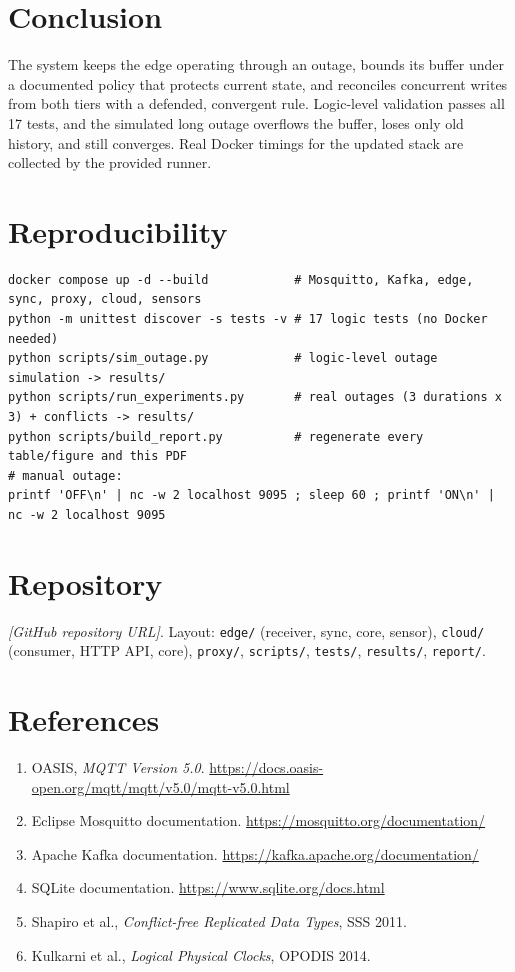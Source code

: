 \documentclass[11pt,a4paper]{article}
\newcommand{\repourl}{\textit{[GitHub repository URL]}}
\begin{document}
\section{Conclusion}
The system keeps the edge operating through an outage, bounds its buffer under a documented policy that protects
current state, and reconciles concurrent writes from both tiers with a defended, convergent rule. Logic-level
validation passes all 17 tests, and the simulated long outage overflows the buffer, loses only old history, and still
converges. Real Docker timings for the updated stack are collected by the provided runner.

\appendix
\section{Reproducibility}
\begin{lstlisting}
docker compose up -d --build            # Mosquitto, Kafka, edge, sync, proxy, cloud, sensors
python -m unittest discover -s tests -v # 17 logic tests (no Docker needed)
python scripts/sim_outage.py            # logic-level outage simulation -> results/
python scripts/run_experiments.py       # real outages (3 durations x 3) + conflicts -> results/
python scripts/build_report.py          # regenerate every table/figure and this PDF
# manual outage:
printf 'OFF\n' | nc -w 2 localhost 9095 ; sleep 60 ; printf 'ON\n' | nc -w 2 localhost 9095
\end{lstlisting}

\section{Repository}
\repourl. Layout: \texttt{edge/} (receiver, sync, core, sensor), \texttt{cloud/} (consumer, HTTP API, core),
\texttt{proxy/}, \texttt{scripts/}, \texttt{tests/}, \texttt{results/}, \texttt{report/}.

\section{References}
\begin{enumerate}[nosep]
\item OASIS, \emph{MQTT Version 5.0}. \url{https://docs.oasis-open.org/mqtt/mqtt/v5.0/mqtt-v5.0.html}
\item Eclipse Mosquitto documentation. \url{https://mosquitto.org/documentation/}
\item Apache Kafka documentation. \url{https://kafka.apache.org/documentation/}
\item SQLite documentation. \url{https://www.sqlite.org/docs.html}
\item Shapiro et al., \emph{Conflict-free Replicated Data Types}, SSS 2011.
\item Kulkarni et al., \emph{Logical Physical Clocks}, OPODIS 2014.
\end{enumerate}
\end{document}
